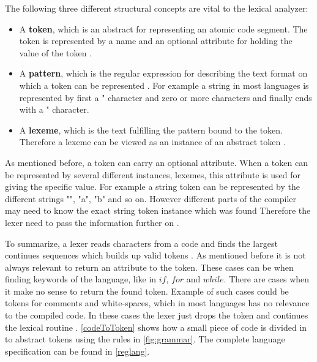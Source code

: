 The following three different structural concepts are vital to the lexical
analyzer:
\begin{itemize}
  \item A \textbf{token}, which is an abstract for representing an atomic code
  segment. The token is represented by a name and an optional attribute for
  holding the value of the token \cite{Aho2006}.
  \item A \textbf{pattern}, which is the regular expression for describing the
  text format on which a token can be represented \cite{Aho2006}. For example a
  string in most languages is represented by first a " character and zero or 
  more characters and finally ends with a " character.
  \item A \textbf{lexeme}, which is the text fulfilling the pattern bound to 
  the token. Therefore a lexeme can be viewed as an instance of an abstract 
  token \cite{Aho2006}.
\end{itemize}
As mentioned before, a token can carry an optional attribute. When a token can
be represented by several different instances, lexemes, this attribute is used
for giving the specific value. For example a string token can be represented by
the different strings "", "a", "b" and so on. However different parts of the
compiler may need to know the exact string token instance which was found
Therefore the lexer need to pass the information further on \cite{Aho2006}.

To summarize, a lexer reads characters from a code and finds the largest 
continues sequences which builds up valid tokens \cite{sebesta2012}. As 
mentioned before it is not always relevant to return an attribute to the token. 
These cases can be when finding keywords of the language, like in $if$, $for$
and $while$. There are cases when it make no sense to return the found token.
Example of such cases could be tokens for comments and white-spaces, which in 
most languages has no relevance to the compiled code. In these cases the lexer 
just drops the token and continues the lexical routine \cite{Aho2006}.
\cref{codeToToken} shows how a small piece of code is divided in to abstract
tokens using the rules in \cref{fig:grammar}. The complete language specification
can be found in \cref{reglang}.

\newpage

